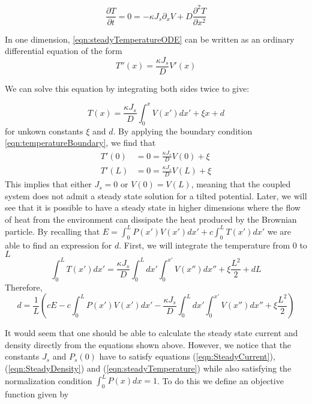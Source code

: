 \begin{equation}
\frac{\partial T}{\partial t} = 0 = -\kappa J_s \partial_x V + D \frac{\partial^2 T}{\partial x^2} \label{eqn:steadyTemperatureODE}
\end{equation}

In one dimension, \ref{eqn:steadyTemperatureODE} can be written as an ordinary differential equation of the form
\begin{equation}
T''(x) = \frac{\kappa J_s}{D} V'(x)
\end{equation}

We can solve this equation by integrating both sides twice to give:

\begin{equation}
T(x) = \frac{\kappa J_s}{D} \int_0^x V(x') dx' + \xi x + d \label{eqn:steadyTemperature}
\end{equation}
for unkown constants $\xi$ and $d$. By applying the boundary condition \ref{eqn:temperatureBoundary}, we find that
\begin{align}
T'(0) & = 0 = \frac{\kappa J_s}{D} V(0) + \xi \\
T'(L) & = 0 = \frac{\kappa J_s}{D} V(L) + \xi
\end{align}
This implies that either $J_s = 0$ or $V(0) = V(L)$, meaning that the coupled system does not admit a steady state solution for a tilted potential. Later, we will see that it is possible to have a steady state in higher dimensions where the flow of heat from the environment can dissipate the heat produced by the Brownian particle. By recalling that $E = \int_0^L P(x') V(x') dx' + c \int_0^L T(x') dx'$ we are able to find an expression for $d$. First, we will integrate the temperature from $0$ to $L$
\begin{equation}
\int_0^L T(x') dx' = \frac{\kappa J_s}{D} \int_0^L dx' \int_0^{x'} V(x'') dx'' + \xi \frac{L^2}{2} + d L
\end{equation}
Therefore,
\begin{equation}
	d = \frac{1}{L} \left(c E - c\int_0^L P(x') V(x') dx' - \frac{\kappa J_s}{D} \int_0^L dx' \int_0^{x'} V(x'') d x'' + \xi \frac{L^2}{2} \right)
\end{equation}

It would seem that one should be able to calculate the steady state current and density directly from the equations shown above. However, we notice that the constants $J_s$ and $P_s(0)$ have to satisfy equations (\ref{eqn:SteadyCurrent}), (\ref{eqn:SteadyDensity}) and (\ref{eqn:steadyTemperature}) while also satisfying the normalization condition $\int_0^L P(x) dx = 1$. To do this we define an objective function given by

